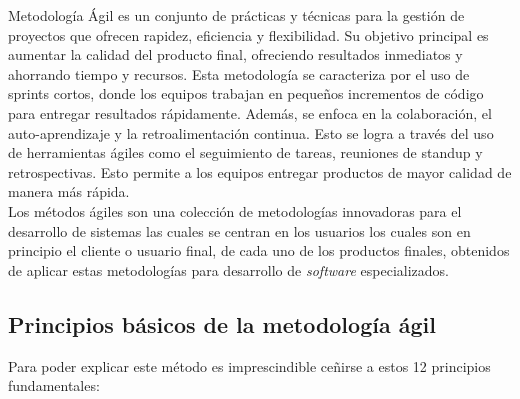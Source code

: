 \documentclass[12pt]{article}
\begin{document}
Metodología Ágil es un conjunto de prácticas y técnicas para la gestión de proyectos que 
ofrecen rapidez, eficiencia y flexibilidad. Su objetivo principal es aumentar la 
calidad del producto final, ofreciendo resultados inmediatos y ahorrando tiempo y recursos. 
Esta metodología se caracteriza por el uso de sprints cortos, donde los equipos trabajan en 
pequeños incrementos de código para entregar resultados rápidamente. Además, se enfoca en 
la colaboración, el auto-aprendizaje y la retroalimentación continua. Esto se logra a través 
del uso de herramientas ágiles como el seguimiento de tareas, reuniones de standup y 
retrospectivas. Esto permite a los equipos entregar productos de mayor calidad de manera 
más rápida.\\

Los métodos ágiles son una colección de metodologías innovadoras para el desarrollo 
de sistemas las cuales se centran en los usuarios los cuales son en principio el 
cliente o usuario final, de cada uno de los productos finales, obtenidos de aplicar estas metodologías para desarrollo de {\it software } especializados.\\ 

\vspace{1cm}
\subsection{ Principios básicos de la metodología ágil }
Para poder explicar este método es imprescindible ceñirse a estos 12 principios fundamentales:
\end{document}

